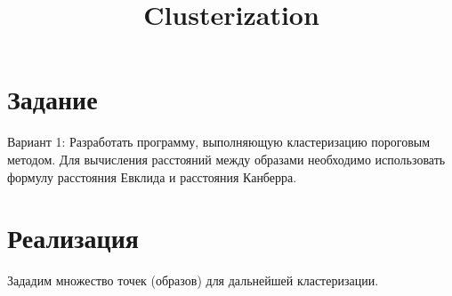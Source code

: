 \documentclass[12pt,a4paper]{article}
\title{Clusterization}
\begin{document}
    
    
    
  \makeqtitle
  \setcounter{page}{2}

    
    

    
    \section{Задание}\label{ux437ux430ux434ux430ux43dux438ux435}

Вариант 1: Разработать программу, выполняющую кластеризацию пороговым
методом. Для вычисления расстояний между образами необходимо
использовать формулу расстояния Евклида и расстояния Канберра.

    \section{Реализация}\label{ux440ux435ux430ux43bux438ux437ux430ux446ux438ux44f}

Зададим множество точек (образов) для дальнейшей кластеризации.
\end{document}
